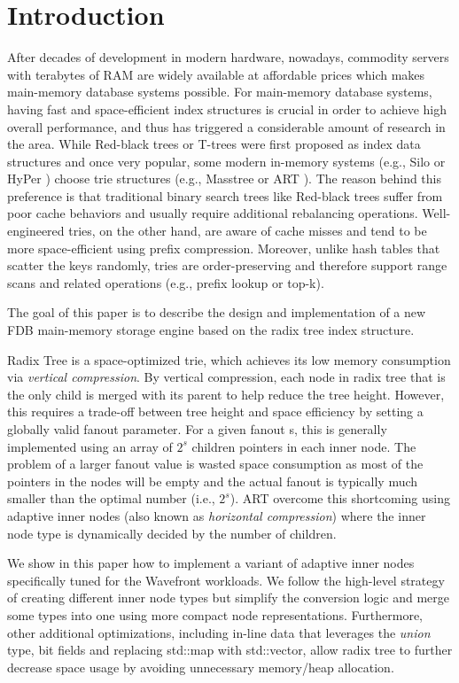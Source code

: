 \documentclass[sigplan,screen,nonacm]{acmart}
\begin{document}
\section{Introduction}
\label{sec:intro}
After decades of development in modern hardware, nowadays, commodity servers with terabytes of RAM are widely available at affordable prices which makes main-memory database systems possible. For main-memory database systems, having fast and space-efficient index structures is crucial in order to achieve high overall performance, and thus has triggered a considerable amount of research in the area. While Red-black trees \cite{bayer1972symmetric} or T-trees \cite{lehman1985study} were first proposed as index data structures and once very popular, some modern in-memory systems (e.g., Silo \cite{tu2013speedy} or HyPer \cite{kemper2011hyper}) choose trie structures (e.g., Masstree \cite{mao2012cache} or ART \cite{leis2013adaptive}). The reason behind this preference is that traditional binary search trees like Red-black trees suffer from poor cache behaviors \cite{rao1998cache} and usually require additional rebalancing operations. Well-engineered tries, on the other hand, are aware of cache misses and tend to be more space-efficient using prefix compression. Moreover, unlike hash tables that scatter the keys randomly, tries are order-preserving and therefore support range scans and related operations (e.g., prefix lookup or top-k).

The goal of this paper is to describe the design and implementation of a new FDB main-memory storage engine based on the radix tree index structure. 

Radix Tree is a space-optimized trie, which achieves its low memory consumption via {\itshape vertical compression}. By vertical compression, each node in radix tree that is the only child is merged with its parent to help reduce the tree height. However, this requires a trade-off between tree height and space efficiency by setting a globally valid fanout parameter. For a given fanout s, this is generally implemented using an array of $2^{s}$ children pointers in each inner node. The problem of a larger fanout value is wasted space consumption as most of the pointers in the nodes will be empty and the actual fanout is typically much smaller than the optimal number (i.e., $2^{s}$). ART overcome this shortcoming using adaptive inner nodes (also known as {\itshape horizontal compression}) where the inner node type is dynamically decided by the number of children. 

We show in this paper how to implement a variant of adaptive inner nodes specifically tuned for the Wavefront workloads. We follow the high-level strategy of creating different inner node types but simplify the conversion logic and merge some types into one using more compact node representations. Furthermore, other additional optimizations, including in-line data that leverages the {\itshape union} type, bit fields and replacing std::map with std::vector, allow radix tree to further decrease space usage by avoiding unnecessary memory/heap allocation. 
\end{document}

